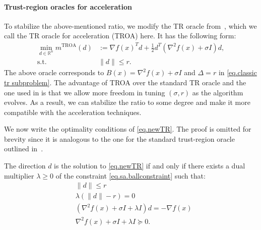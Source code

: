 \documentclass{mcom-l}
\numberwithin{equation}{section}
\begin{document}
\paragraph{Trust-region oracles for acceleration}
To stabilize the above-mentioned ratio, we modify the TR oracle from~\citet{jiang2024nonconvexityuniversaltrustregionmethod}, which we call the TR oracle for acceleration (TROA) here. It has the following form:
\begin{subequations}\label{eq.newTR}
    \begin{align}
        \min_{d \in \mathbb{R}^n} m^{\text{TROA}}(d) & :=\nabla f(x)^T d + \tfrac{1}{2}d^T (\nabla^2 f(x) + \sigma I) d, \\\label{eq.sa.ballconstraint} \operatorname{s.t.} ~& \|d\| \le r.
    \end{align}
\end{subequations}
The above oracle corresponds to $B(x)= \nabla^2 f(x)+\sigma I $ and $\Delta = r$ in \eqref{eq.classic tr subproblem}. The advantage of TROA over the standard TR oracle and the one used in \cite{jiang2024nonconvexityuniversaltrustregionmethod} is that we allow more freedom in tuning $(\sigma,r)$ as the algorithm evolves. As a result, we can stabilize the ratio to some degree and make it more compatible with the acceleration techniques.

We now write the optimality conditions of \eqref{eq.newTR}. The proof is omitted for brevity since it is analogous to the one for the standard trust-region oracle outlined in~\citet[Section 3]{conn2000trust}.
\begin{lemma}\label{lem.optimal condition}
    The direction $d$ is the solution to \eqref{eq.newTR} if and only if there exists a dual multiplier $\lambda \geq 0$ of the constraint \eqref{eq.sa.ballconstraint} such that: \begin{subequations}\label{eq.sa}
        \begin{align}
            \label{eq.optcond primal}
             & \| d\| \leq r                                                       \\
            \label{eq.optcond coml slack}
             & \lambda \left(\|d\|-r \right)=0                                     \\ \label{eq.optcond firstorder}
             & \left(\nabla^2 f(x) + \sigma I + \lambda I \right) d = -\nabla f(x) \\
            \label{eq.optcond secondorder}
             & \nabla^2 f(x) + \sigma I + \lambda I \succeq 0.
        \end{align}
    \end{subequations}
\end{lemma}
\end{document}
